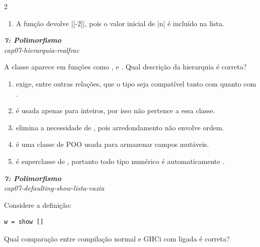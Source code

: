 \documentclass[a4paper,10pt,brazil]{article}
\begin{document}
\begin{multicols}{2}
\begin{enumerate}
  \item A função devolve \haskellinline|[-2]|, pois o valor inicial de \haskellinline|n| é incluído na lista.


\end{enumerate}

\begin{flushright}
  \footnotesize
  \textit{\textbf{7: Polimorfismo}}\\
  \textit{cap07-hierarquia-realfrac}\\

\end{flushright}
A classe  aparece em funções como ,  e . Qual descrição da hierarquia é correta?
\begin{enumerate}
  \item {} exige, entre outras relações, que o tipo seja compatível tanto com  quanto com .
  \item {} é usada apenas para inteiros, por isso  não pertence a essa classe.
  \item {} elimina a necessidade de , pois arredondamento não envolve ordem.
  \item {} é uma classe de POO usada para armazenar campos mutáveis.
  \item {} é superclasse de , portanto todo tipo numérico é automaticamente .

\end{enumerate}

\begin{flushright}
  \footnotesize
  \textit{\textbf{7: Polimorfismo}}\\
  \textit{cap07-defaulting-show-lista-vazia}\\

\end{flushright}
Considere a definição:

\begin{verbatim}
w = show []
\end{verbatim}

Qual comparação entre compilação normal e GHCi com  ligada é correta?


\end{multicols}
\end{document}
